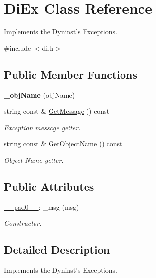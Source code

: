 \hypertarget{class_di_ex}{\section{Di\-Ex Class Reference}
\label{class_di_ex}
}


Implements the Dyninst's Exceptions.  




{\ttfamily \#include $<$di.\-h$>$}

\subsection*{Public Member Functions}
\begin{DoxyCompactItemize}
\item 
\hypertarget{class_di_ex_ab71373ff998e8179b17ca65be0aee491}{{\bfseries \-\_\-obj\-Name} (obj\-Name)}\label{class_di_ex_ab71373ff998e8179b17ca65be0aee491}

\item 
string const \& \hyperlink{class_di_ex_a977a9ac4395817363e569f1016fb8340}{Get\-Message} () const 
\begin{DoxyCompactList}\small\item\em Exception message getter. \end{DoxyCompactList}\item 
string const \& \hyperlink{class_di_ex_ae1b98e1e8b577f168deaea6852a7139b}{Get\-Object\-Name} () const 
\begin{DoxyCompactList}\small\item\em Object Name getter. \end{DoxyCompactList}\end{DoxyCompactItemize}
\subsection*{Public Attributes}
\begin{DoxyCompactItemize}
\item 
\hyperlink{class_di_ex_ad80ae482a21daa73f24fcc9c5911523f}{\-\_\-\-\_\-pad0\-\_\-\-\_\-}\-: \-\_\-msg (msg)
\begin{DoxyCompactList}\small\item\em Constructor. \end{DoxyCompactList}\end{DoxyCompactItemize}


\subsection{Detailed Description}
Implements the Dyninst's Exceptions. 

